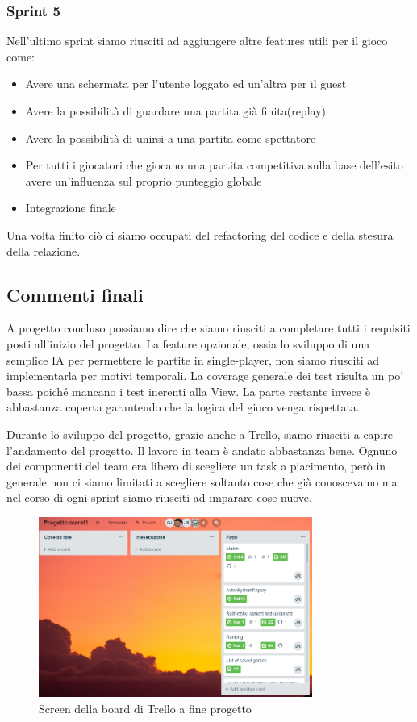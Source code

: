 \subsubsection{Sprint 5}
Nell’ultimo sprint siamo riusciti ad aggiungere altre features utili per il gioco come:
 \begin {itemize}
  \item Avere una schermata per l’utente loggato ed un’altra per il guest
  \item Avere la possibilità di guardare una partita già finita(replay)
  \item Avere la possibilità di unirsi a una partita come spettatore
  \item Per tutti i giocatori che giocano una partita competitiva sulla base dell'esito avere un'influenza sul proprio punteggio globale
  \item Integrazione finale
\end {itemize}

Una volta finito ciò ci siamo occupati del refactoring del codice e della stesura della relazione.
\bigskip
\subsection{Commenti finali}

A progetto concluso possiamo dire che siamo riusciti a completare tutti i requisiti posti all’inizio del progetto. La feature opzionale, ossia lo sviluppo di una semplice IA per permettere le partite in single-player, non siamo riusciti ad implementarla per motivi temporali.
La coverage generale dei test risulta un po’ bassa poiché mancano i test inerenti alla View. La parte restante invece è abbastanza coperta garantendo che la logica del gioco venga rispettata.

Durante lo sviluppo del progetto, grazie anche a Trello, siamo riusciti a capire l’andamento del progetto. Il lavoro in team è andato abbastanza bene. Ognuno dei componenti del team era libero di scegliere un task a piacimento, però in generale non ci siamo limitati a scegliere soltanto cose che già conoscevamo ma nel corso di ogni sprint siamo riusciti ad imparare cose nuove.

\begin{figure}[h!]
 \centering
  \includegraphics[width=0.8\textwidth]{trello.png}
   \caption{Screen della board di Trello a fine progetto }
\end{figure}


